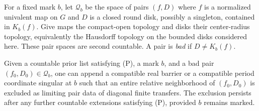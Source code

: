 For a fixed mark $b$, let $\mathcal Q_b$ be the space of pairs $(f,D)$
where $f$ is a normalized univalent map on $G$ and $D$ is a closed
round disk, possibly a singleton, contained in $K_b(f)$.  Give maps
the compact-open topology and disks their center-radius topology,
equivalently the Hausdorff topology on the bounded disks considered
here.  These pair spaces are second countable.  A pair is \emph{bad}
if $D\ne K_b(f)$.

\begin{lemma}\label{lem:bad-pair}
Given a countable prior list satisfying (P), a mark $b$, and a bad
pair $(f_0,D_0)\in\mathcal Q_b$, one can append a compatible real
barrier or a compatible period coordinate singular at $b$ such that
an entire relative neighborhood of $(f_0,D_0)$ is excluded as limiting
pair data of diagonal finite transfers.  The exclusion persists after
any further countable extensions satisfying (P), provided $b$ remains
marked.
\end{lemma}

